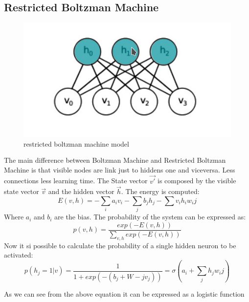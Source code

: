 \subsection{Restricted Boltzman Machine}
\begin{figure}
  \centering
    \includegraphics[scale=0.65]{img/RestrictedBoltzmanMachine.png}
    \caption{restricted boltzman machine model}
    \label{img:restricted_bolzman_machine}
 \end{figure}
 The main difference between Boltzman Machine and Restricted Boltzman Machine is that visible nodes are link just to hiddens one and viceversa. Less connections less learning time. The State vector $\vec{v'}$ is composed by the visible state vector $\vec{v}$ and the hidden vector $\vec{h}$. The energy is computed:
 \begin{equation}
 E(v,h) = - \sum_{i} a_iv_i - \sum_j b_j h_j - \sum v_i h_i w_ij
 \end{equation}
Where $a_i$ and $b_i$ are the bias. The probability of the system can be expressed as:
\begin{equation}
p(v,h) = \frac{exp(-E(v,h))}{\sum_{v,h} exp(-E(v,h))}
\end{equation}
Now it si possible to calculate the probability of a single hidden neuron to be activated:
\begin{equation}
p(h_j = 1 | v) = \frac{1}{1 + exp(-(b_j+W-jv_j))} = \sigma (a_i + \sum_j h_j w_ij)
\end{equation}

As we can see from the above equation it can be expressed as a logistic function